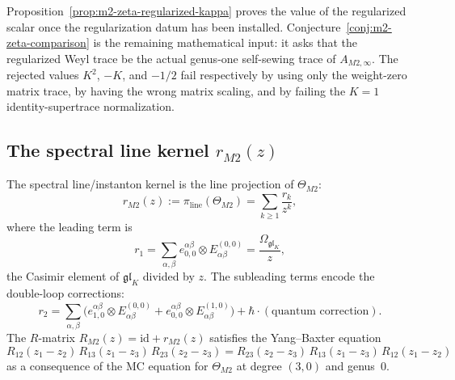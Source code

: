 \begin{remark}
Proposition~\ref{prop:m2-zeta-regularized-kappa} proves the value of
the regularized scalar once the regularization datum has been installed.
Conjecture~\ref{conj:m2-zeta-comparison} is the remaining mathematical
input: it asks that the regularized Weyl trace be the actual
genus-one self-sewing trace of \(A_{M2,\infty}\).  The rejected values
\(K^2\), \(-K\), and \(-1/2\) fail respectively by using only the
weight-zero matrix trace, by having the wrong matrix scaling, and by
failing the \(K=1\) identity-supertrace normalization.
\end{remark}

\subsection{The spectral line kernel \texorpdfstring{$r_{M2}(z)$}{r\_\{M2\}(z)}}

\begin{theorem}
The spectral line/instanton kernel is the line projection of
$\Theta_{M2}$:
\begin{equation}%
r_{M2}(z)
:= \pi_{\mathrm{line}}(\Theta_{M2})
= \sum_{k\ge 1}\frac{r_k}{z^k},
\end{equation}
where the leading term is
\begin{equation}%
r_1
= \sum_{\alpha,\beta}
e^{\alpha\beta}_{0,0}\otimes E^{(0,0)}_{\alpha\beta}
= \frac{\Omega_{\mathfrak{gl}_K}}{z},
\end{equation}
the Casimir element of $\mathfrak{gl}_K$ divided by $z$.
The subleading terms encode the double-loop corrections:
\begin{equation}%
r_2
= \sum_{\alpha,\beta}\bigl(
e^{\alpha\beta}_{1,0}\otimes E^{(0,0)}_{\alpha\beta}
+ e^{\alpha\beta}_{0,0}\otimes E^{(1,0)}_{\alpha\beta}
\bigr)
+ \hbar\cdot(\text{quantum correction}).
\end{equation}
The $R$-matrix $R_{M2}(z) = \mathrm{id} + r_{M2}(z)$
satisfies the Yang--Baxter equation
\begin{equation}%
R_{12}(z_1-z_2)\,R_{13}(z_1-z_3)\,R_{23}(z_2-z_3)
= R_{23}(z_2-z_3)\,R_{13}(z_1-z_3)\,R_{12}(z_1-z_2)
\end{equation}
as a consequence of the MC equation for $\Theta_{M2}$ at
degree $(3,0)$ and genus~$0$.
\end{theorem}

